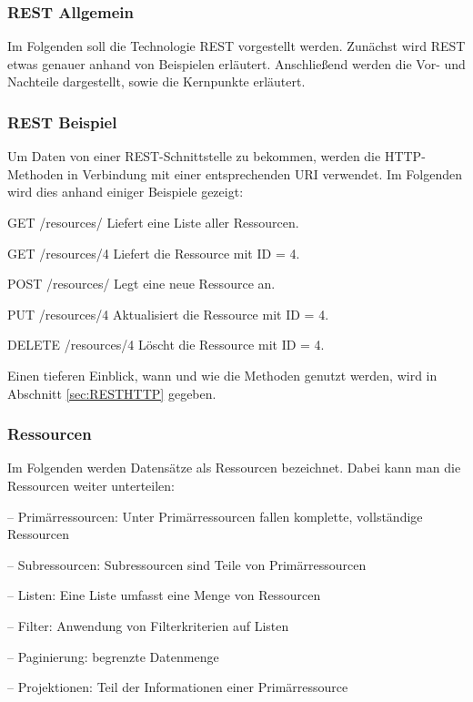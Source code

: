 \subsubsection{\ac{REST} Allgemein}
\label{sec:RESTAllgemein}

Im Folgenden soll die Technologie \ac{REST} vorgestellt werden.
Zunächst wird \ac{REST} etwas genauer anhand von Beispielen erläutert.
Anschließend werden die Vor- und Nachteile dargestellt, sowie die Kernpunkte erläutert.

\subsubsection{\ac{REST} Beispiel}
\label{sec:RESTBeispiel}

Um Daten von einer \ac{REST}-Schnittstelle zu bekommen, werden die \ac{HTTP}-Methoden in Verbindung mit einer entsprechenden \ac{URI} verwendet. Im Folgenden wird dies anhand einiger Beispiele gezeigt:

GET /resources/
Liefert eine Liste aller Ressourcen.

GET /resources/4
Liefert die Ressource mit ID = 4.

POST /resources/
Legt eine neue Ressource an.

PUT /resources/4
Aktualisiert die Ressource mit ID = 4.

DELETE /resources/4
Löscht die Ressource mit ID = 4.

Einen tieferen Einblick, wann und wie die Methoden genutzt werden, wird in Abschnitt \ref{sec:RESTHTTP} gegeben.

\subsubsection{Ressourcen}
\label{sec:RESTRessourcen}

Im Folgenden werden Datensätze als Ressourcen bezeichnet. Dabei kann man die Ressourcen weiter unterteilen:

–	Primärressourcen: Unter Primärressourcen fallen komplette, vollständige Ressourcen

–	Subressourcen: Subressourcen sind Teile von Primärressourcen

–	Listen: Eine Liste umfasst eine Menge von Ressourcen

–	Filter: Anwendung von Filterkriterien auf Listen

–	Paginierung: begrenzte Datenmenge

–	Projektionen: Teil der Informationen einer Primärressource

